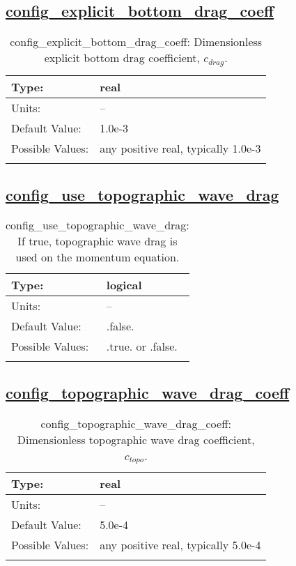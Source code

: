 \subsection[config\_explicit\_bottom\_drag\_coeff]{\hyperref[sec:nm_tab_bottom_drag]{config\_explicit\_bottom\_drag\_coeff}}
\label{subsec:nm_sec_config_explicit_bottom_drag_coeff}
\begin{center}
\begin{longtable}{| p{2.0in} || p{4.0in} |}
    \hline
    Type: & real \\
    \hline
    Units: & -- \\
    \hline
    Default Value: & 1.0e-3 \\
    \hline
    Possible Values: & any positive real, typically 1.0e-3 \\
    \hline
    \caption{config\_explicit\_bottom\_drag\_coeff: Dimensionless explicit bottom drag coefficient, $c_{drag}$.}
\end{longtable}
\end{center}
\subsection[config\_use\_topographic\_wave\_drag]{\hyperref[sec:nm_tab_bottom_drag]{config\_use\_topographic\_wave\_drag}}
\label{subsec:nm_sec_config_use_topographic_wave_drag}
\begin{center}
\begin{longtable}{| p{2.0in} || p{4.0in} |}
    \hline
    Type: & logical \\
    \hline
    Units: & -- \\
    \hline
    Default Value: & .false. \\
    \hline
    Possible Values: & .true. or .false. \\
    \hline
    \caption{config\_use\_topographic\_wave\_drag: If true, topographic wave drag is used on the momentum equation.}
\end{longtable}
\end{center}
\subsection[config\_topographic\_wave\_drag\_coeff]{\hyperref[sec:nm_tab_bottom_drag]{config\_topographic\_wave\_drag\_coeff}}
\label{subsec:nm_sec_config_topographic_wave_drag_coeff}
\begin{center}
\begin{longtable}{| p{2.0in} || p{4.0in} |}
    \hline
    Type: & real \\
    \hline
    Units: & -- \\
    \hline
    Default Value: & 5.0e-4 \\
    \hline
    Possible Values: & any positive real, typically 5.0e-4 \\
    \hline
    \caption{config\_topographic\_wave\_drag\_coeff: Dimensionless topographic wave drag coefficient, $c_{topo}$.}
\end{longtable}
\end{center}
